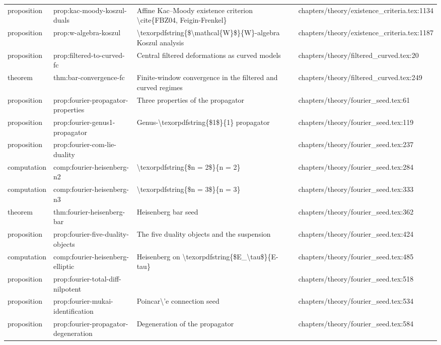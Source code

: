 \documentclass[11pt]{article}
\begin{document}
\begin{longtable}{L{0.10\textwidth}L{0.26\textwidth}L{0.42\textwidth}L{0.22\textwidth}}
proposition & prop:kac-moody-koszul-duals & Affine Kac--Moody existence criterion \textbackslash{}cite\{FBZ04, Feigin-Frenkel\} & chapters/theory/existence\_criteria.tex:1134\\
proposition & prop:w-algebra-koszul & \textbackslash{}texorpdfstring\{\$\textbackslash{}mathcal\{W\}\$\}\{W\}-algebra Koszul analysis & chapters/theory/existence\_criteria.tex:1187\\
proposition & prop:filtered-to-curved-fc & Central filtered deformations as curved models & chapters/theory/filtered\_curved.tex:20\\
theorem & thm:bar-convergence-fc & Finite-window convergence in the filtered and curved regimes & chapters/theory/filtered\_curved.tex:249\\
proposition & prop:fourier-propagator-properties & Three properties of the propagator & chapters/theory/fourier\_seed.tex:61\\
proposition & prop:fourier-genus1-propagator & Genus-\textbackslash{}texorpdfstring\{\$1\$\}\{1\} propagator & chapters/theory/fourier\_seed.tex:119\\
proposition & prop:fourier-com-lie-duality &  & chapters/theory/fourier\_seed.tex:237\\
computation & comp:fourier-heisenberg-n2 & \textbackslash{}texorpdfstring\{\$n = 2\$\}\{n = 2\} & chapters/theory/fourier\_seed.tex:284\\
computation & comp:fourier-heisenberg-n3 & \textbackslash{}texorpdfstring\{\$n = 3\$\}\{n = 3\} & chapters/theory/fourier\_seed.tex:333\\
theorem & thm:fourier-heisenberg-bar & Heisenberg bar seed & chapters/theory/fourier\_seed.tex:362\\
proposition & prop:fourier-five-duality-objects & The five duality objects and the suspension & chapters/theory/fourier\_seed.tex:424\\
computation & comp:fourier-heisenberg-elliptic & Heisenberg on \textbackslash{}texorpdfstring\{\$E\_\textbackslash{}tau\$\}\{E-tau\} & chapters/theory/fourier\_seed.tex:485\\
proposition & prop:fourier-total-diff-nilpotent &  & chapters/theory/fourier\_seed.tex:518\\
proposition & prop:fourier-mukai-identification & Poincar\textbackslash{}'e connection seed & chapters/theory/fourier\_seed.tex:534\\
proposition & prop:fourier-propagator-degeneration & Degeneration of the propagator & chapters/theory/fourier\_seed.tex:584\\

\end{longtable}
\end{document}
